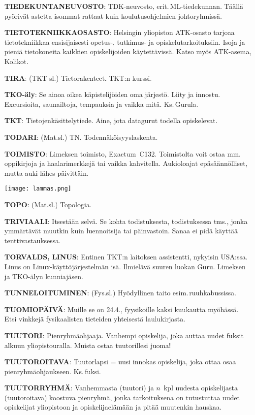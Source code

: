 \documentclass[../ala_hataile.tex]{subfiles}
\begin{document}
\textbf{TIEDEKUNTANEUVOSTO}: TDK-neuvosto,
erit.\,ML-tiedekunnan. Täällä
pyörivät astetta isommat rattaat kuin koulutus\-ohjelmien
johtoryhmissä.

\textbf{TIETOTEKNIIKKAOSASTO}: Helsingin
yliopiston ATK-osasto tarjoaa tietotekniikkaa
ensisijaisesti opetus-, tutkimus- ja
opiskelutarkoituksiin. Isoja ja pieniä tietokoneita
kaikkien opiskelijoiden käytettävissä.
Katso myös ATK-asema, Kolikot.

\textbf{TIRA}: (TKT sl.) Tietorakenteet. TKT:n
kurssi.

\textbf{TKO-äly}: Se ainoa oikea käpistelijöiden
oma järjestö. Liity ja innostu. Excursioita,
saunailtoja, tempauksia ja vaikka mitä. Ks.\,Gurula.

\textbf{TKT}: Tietojenkäsittelytiede. Aine, jota datagurut
todella opiskelevat.

\textbf{TODARI}: (Mat.sl.) TN. Todennäköisyyslaskenta.

\textbf{TOIMISTO}: Limeksen toimisto, Exactum~C132. Toimistolta voit ostaa mm.\,oppikirjoja
ja haalarimerkkejä tai vaikka kahvitella.
Aukioloajat epäsäännölliset, mutta auki
lähes päivittäin.

\begin{figure*}[!b]
	\centering
	\texttt{[image: lammas.png]}
\end{figure*}
\textbf{TOPO}: (Mat.sl.) Topologia.

\textbf{TRIVIAALI}: Itsestään selvä. Se kohta
todistuksesta, todistuksessa tms., jonka
ymmärtävät muutkin kuin luennoitsija tai
päinvastoin. Sanaa ei pidä käyttää tenttivastauksessa.

\textbf{TORVALDS, LINUS}: Entinen TKT:n laitoksen
assistentti, nykyisin USA:ssa. Linus
on Linux-käyttöjärjestelmän isä. Ilmielävä
suuren luokan Guru. Limeksen ja TKO-älyn
kunniajäsen.

\textbf{TUNNELOITUMINEN}: (Fys.sl.) Hyödyllinen
taito esim.\,ruuhkabussissa.

\textbf{TUOMIOPÄIVÄ}: Muille se on 24.4.,
fyysikoille kaksi kuukautta myöhässä. Etsi
vinkkejä fysikaalisten tieteiden yhteisestä
laulukirjasta.

\textbf{TUUTORI}: Pienryhmäohjaaja. Vanhempi
opiskelija, joka auttaa uudet fuksit alkuun
yliopistouralla. Muista ostaa tuutorillesi
juoma!

\textbf{TUUTOROITAVA}: Tuutorlapsi = uusi
innokas opiskelija, joka ottaa osaa pienryhmäohjaukseen.
Ks.\,fuksi.

\textbf{TUUTORRYHMÄ}: Vanhemmasta (tuutori)
ja $n$~kpl uudesta opiskelijasta (tuutoroitava)
koostuva pienryhmä, jonka tarkoituksena
on tutustuttaa uudet opiskelijat
yliopistoon ja opiskelijaelämään ja pitää
muutenkin hauskaa.
\end{document}
